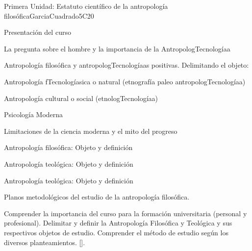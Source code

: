 \begin{syllabus}
\begin{unit}{}{Primera Unidad: Estatuto científico de la antropología filosófica}{GarciaCuadrado}{5}{C20}
\begin{topics}
	\item Presentación del curso
	\item La pregunta sobre el hombre y la importancia de la AntropologTecnologíaa
	\item Antropología filosófica y antropologTecnologíaas positivas. Delimitando el objeto: 
	\begin{subtopics}
		\item Antropología fTecnologíasica o natural (etnografía  paleo antropologTecnologíaa)
		\item Antropología cultural o social (etnologTecnologíaa)
		\item Psicología Moderna
		\item Limitaciones de la ciencia moderna y el mito del progreso
		\item Antropología filosófica: Objeto y definición
		\item Antropología teológica: Objeto y definición
		\item Antropología teológica: Objeto y definición	
	\end{subtopics}
	\item Planos metodológicos del estudio de la antropología filosófica. 
\end{topics}

\begin{learningoutcomes}
	\item Comprender la importancia del curso para la formación universitaria (personal y profesional).
Delimitar y definir la Antropología Filosófica y Teológica y sus respectivos objetos de estudio.
Comprender el método de estudio según los diversos planteamientos. [\Usage].

\end{learningoutcomes}
\end{unit}


\end{syllabus}
